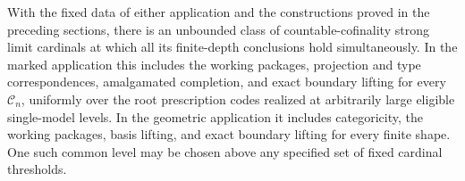 \begin{theorem}
\label{close:common-levels}
With the fixed data of either application and the constructions proved
in the preceding sections, there is an unbounded class of
countable-cofinality strong limit cardinals at which all its finite-depth
conclusions hold simultaneously.  In the marked application this
includes the working packages, projection and type correspondences,
amalgamated completion, and exact boundary lifting for every
$\mathcal C_n$, uniformly over the root prescription codes realized
at arbitrarily large eligible single-model levels.
In the geometric application it includes categoricity, the working
packages, basis lifting, and exact boundary lifting for every finite
shape.  One such common level may be chosen above any specified set of
fixed cardinal thresholds.
\end{theorem}

